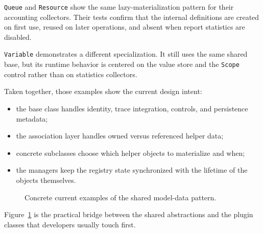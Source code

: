 \texttt{Queue} and \texttt{Resource} show the same lazy-materialization pattern for their
accounting collectors. Their tests confirm that the internal definitions are
created on first use, reused on later operations, and absent when report
statistics are disabled.

\texttt{Variable} demonstrates a different specialization. It still uses the same
shared base, but its runtime behavior is centered on the value store and the
\texttt{Scope} control rather than on statistics collectors.

Taken together, those examples show the current design intent:
\begin{itemize}
\item the base class handles identity, trace integration, controls, and
      persistence metadata;
\item the association layer handles owned versus referenced helper data;
\item concrete subclasses choose which helper objects to materialize and when;
\item the managers keep the registry state synchronized with the lifetime of
      the objects themselves.
\end{itemize}

\begin{figure}[htbp]
\centering
\caption{Concrete current examples of the shared model-data pattern.}
\label{fig:model-component-concrete-example}
\end{figure}

Figure~\ref{fig:model-component-concrete-example} is the practical bridge
between the shared abstractions and the plugin classes that developers usually
touch first.

